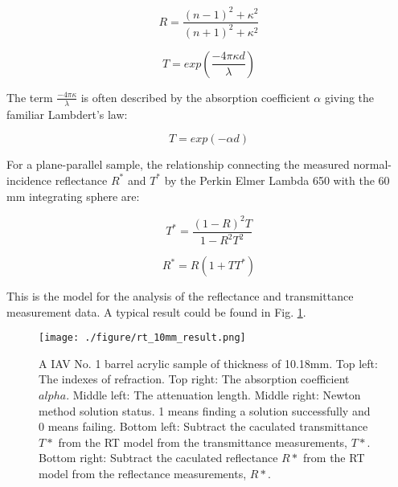 \begin{equation}
\label{eq:FSR}
R = \frac{(n-1)^2 + \kappa^2}{(n+1)^2 + \kappa^2}
\end{equation}


\begin{equation}
\label{eq:IT}
T = exp(\frac{-4{\pi}{\kappa}d}{\lambda})
\end{equation}

The term $\frac{-4{\pi}{\kappa}}{\lambda}$ is often described by the absorption coefficient $\alpha$ giving the familiar Lambdert's law:

\begin{equation}
\label{eq:Lambdert}
T = exp(-{\alpha}d)
\end{equation}

For a plane-parallel sample, the relationship connecting the measured normal-incidence reflectance $R^*$ and $T^*$ by the
Perkin Elmer Lambda 650 with the 60 mm integrating sphere are:


\begin{equation}
\label{eq:TStar}
T^* = \frac{(1-R)^2T}{1-R^2T^2}
\end{equation}


\begin{equation}
\label{eq:RStar}
R^* = R(1+TT^*)
\end{equation}


This is the model for the analysis of the reflectance and transmittance measurement data.
A typical result could be found in Fig. \ref{fig:rt_10mm_result.png}.


\begin{figure}[p]
    \centering
    \texttt{[image: ./figure/rt\_10mm\_result.png]}
    \caption[Result of RT method]
{A IAV No. 1 barrel acrylic sample of thickness of 10.18mm.
Top left: The indexes of refraction.
Top right: The absorption coefficient $alpha$.
Middle left: The attenuation length.
Middle right: Newton method solution status. 1 means finding a solution successfully and 0 means failing.
Bottom left: Subtract the caculated transmittance $T*$ from the RT model from the transmittance measurements, $T*$.
Bottom right: Subtract the caculated reflectance $R*$ from the RT model from the reflectance measurements, $R*$.
}
    \label{fig:rt_10mm_result.png}
    \end{figure}

